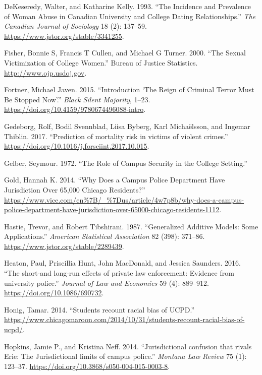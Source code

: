 \documentclass{ucetd}
\begin{document}
\leavevmode\hypertarget{ref-DeKeseredy1993}{}%
DeKeseredy, Walter, and Katharine Kelly. 1993. ``The Incidence and
Prevalence of Woman Abuse in Canadian University and College Dating
Relationships.'' \emph{The Canadian Journal of Sociology} 18 (2):
137--59. \url{https://www.jstor.org/stable/3341255}.

\leavevmode\hypertarget{ref-Fisher2000}{}%
Fisher, Bonnie S, Francis T Cullen, and Michael G Turner. 2000. ``The
Sexual Victimization of College Women.'' Bureau of Justice Statistics.
\url{http://www.ojp.usdoj.gov}.

\leavevmode\hypertarget{ref-Fortner2015}{}%
Fortner, Michael Javen. 2015. ``Introduction `The Reign of Criminal
Terror Must Be Stopped Now'.'' \emph{Black Silent Majority}, 1--23.
\url{https://doi.org/10.4159/9780674496088-intro}.

\leavevmode\hypertarget{ref-Gedeborg2017}{}%
Gedeborg, Rolf, Bodil Svennblad, Liisa Byberg, Karl Michaëlsson, and
Ingemar Thiblin. 2017. ``Prediction of mortality risk in victims of
violent crimes.'' \url{https://doi.org/10.1016/j.forsciint.2017.10.015}.

\leavevmode\hypertarget{ref-Gelber1972}{}%
Gelber, Seymour. 1972. ``The Role of Campus Security in the College
Setting.''

\leavevmode\hypertarget{ref-Gold2014}{}%
Gold, Hannah K. 2014. ``Why Does a Campus Police Department Have
Jurisdiction Over 65,000 Chicago Residents?''
\url{https://www.vice.com/en\%7B/_\%7Dus/article/4w7p8b/why-does-a-campus-police-department-have-jurisdiction-over-65000-chicago-residents-1112}.

\leavevmode\hypertarget{ref-Hastie1987}{}%
Hastie, Trevor, and Robert Tibshirani. 1987. ``Generalized Additive
Models: Some Applications.'' \emph{American Statistical Association} 82
(398): 371--86. \url{https://www.jstor.org/stable/2289439}.

\leavevmode\hypertarget{ref-Heaton2016}{}%
Heaton, Paul, Priscillia Hunt, John MacDonald, and Jessica Saunders.
2016. ``The short-and long-run effects of private law enforcement:
Evidence from university police.'' \emph{Journal of Law and Economics}
59 (4): 889--912. \url{https://doi.org/10.1086/690732}.

\leavevmode\hypertarget{ref-Honig2014}{}%
Honig, Tamar. 2014. ``Students recount racial bias of UCPD.''
\url{https://www.chicagomaroon.com/2014/10/31/students-recount-racial-bias-of-ucpd/}.

\leavevmode\hypertarget{ref-Hopkins2014}{}%
Hopkins, Jamie P., and Kristina Neff. 2014. ``Jurisdictional confusion
that rivals Erie: The Jurisdictional limits of campus police.''
\emph{Montana Law Review} 75 (1): 123--37.
\url{https://doi.org/10.3868/s050-004-015-0003-8}.
\end{document}
